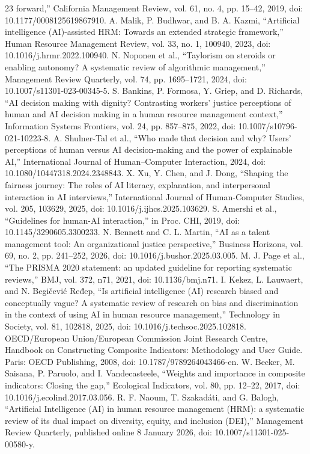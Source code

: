 \documentclass[
  10pt,
  runningheads]{llncs}
\begin{document}
\begin{thebibliography}{23}
forward,'' California Management Review, vol. 61, no. 4, pp. 15--42,
2019, doi: 10.1177/0008125619867910.
 A. Malik, P. Budhwar, and B. A. Kazmi, ``Artificial
intelligence (AI)-assisted HRM: Towards an extended strategic
framework,'' Human Resource Management Review, vol. 33, no. 1, 100940,
2023, doi: 10.1016/j.hrmr.2022.100940.
 N. Noponen et al., ``Taylorism on steroids or enabling
autonomy? A systematic review of algorithmic management,'' Management
Review Quarterly, vol. 74, pp. 1695--1721, 2024, doi:
10.1007/s11301-023-00345-5.
 S. Bankins, P. Formosa, Y. Griep, and D. Richards, ``AI
decision making with dignity? Contrasting workers' justice perceptions
of human and AI decision making in a human resource management
context,'' Information Systems Frontiers, vol. 24, pp. 857--875, 2022,
doi: 10.1007/s10796-021-10223-8.
 A. Shulner-Tal et al., ``Who made that decision and why? Users'
perceptions of human versus AI decision-making and the power of
explainable AI,'' International Journal of Human--Computer Interaction,
2024, doi: 10.1080/10447318.2024.2348843.
 X. Xu, Y. Chen, and J. Dong, ``Shaping the fairness journey:
The roles of AI literacy, explanation, and interpersonal interaction in
AI interviews,'' International Journal of Human-Computer Studies, vol.
205, 103629, 2025, doi: 10.1016/j.ijhcs.2025.103629.
 S. Amershi et al., ``Guidelines for human-AI interaction,'' in
Proc. CHI, 2019, doi: 10.1145/3290605.3300233.
 N. Bennett and C. L. Martin, ``AI as a talent management tool:
An organizational justice perspective,'' Business Horizons, vol. 69, no.
2, pp. 241--252, 2026, doi: 10.1016/j.bushor.2025.03.005.
 M. J. Page et al., ``The PRISMA 2020 statement: an updated
guideline for reporting systematic reviews,'' BMJ, vol. 372, n71, 2021,
doi: 10.1136/bmj.n71.
 I. Kekez, L. Lauwaert, and N. Begičević Ređep, ``Is artificial
intelligence (AI) research biased and conceptually vague? A systematic
review of research on bias and discrimination in the context of using AI
in human resource management,'' Technology in Society, vol. 81, 102818,
2025, doi: 10.1016/j.techsoc.2025.102818.
 OECD/European Union/European Commission Joint Research Centre,
Handbook on Constructing Composite Indicators: Methodology and User
Guide. Paris: OECD Publishing, 2008, doi: 10.1787/9789264043466-en.
 W. Becker, M. Saisana, P. Paruolo, and I. Vandecasteele,
``Weights and importance in composite indicators: Closing the gap,''
Ecological Indicators, vol. 80, pp. 12--22, 2017, doi:
10.1016/j.ecolind.2017.03.056.
 R. F. Naoum, T. Szakadáti, and G. Balogh, ``Artificial
Intelligence (AI) in human resource management (HRM): a systematic
review of its dual impact on diversity, equity, and inclusion (DEI),''
Management Review Quarterly, published online 8 January 2026, doi:
10.1007/s11301-025-00580-y.
\end{thebibliography}
\end{document}
